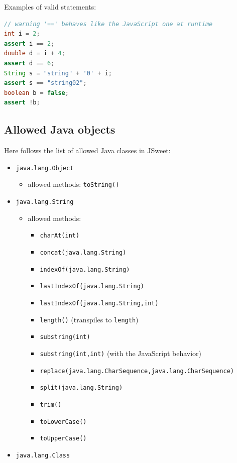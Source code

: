 \documentclass[a4paper]{report}
\begin{document}
\noindent
Examples of valid statements:

\begin{lstlisting}[language=Java]
// warning '==' behaves like the JavaScript one at runtime
int i = 2;
assert i == 2;
double d = i + 4;
assert d == 6;
String s = "string" + '0' + i;
assert s == "string02";
boolean b = false;
assert !b;
\end{lstlisting}

\subsection{Allowed Java objects}

Here follows the list of allowed Java classes in JSweet:

\begin{itemize}
\item \texttt{java.lang.Object}
	\begin{itemize}
	\item allowed methods: \texttt{toString()}
	\end{itemize}
\item \texttt{java.lang.String}
	\begin{itemize}
	\item allowed methods: 
			\begin{itemize}
				\item \texttt{charAt(int)}
				\item \texttt{concat(java.lang.String)} 
				\item \texttt{indexOf(java.lang.String)}
				\item \texttt{lastIndexOf(java.lang.String)}
				\item \texttt{lastIndexOf(java.lang.String,int)}
				\item \texttt{length()} (transpiles to \texttt{length})
				\item \texttt{substring(int)}
				\item \texttt{substring(int,int)} (with the JavaScript behavior)
				\item \texttt{replace(java.lang.CharSequence,java.lang.CharSequence)}
				\item \texttt{split(java.lang.String)}
				\item \texttt{trim()}
				\item \texttt{toLowerCase()}
				\item \texttt{toUpperCase()}
			\end{itemize}
	\end{itemize}
\item \texttt{java.lang.Class}

\end{itemize}
\end{document}
